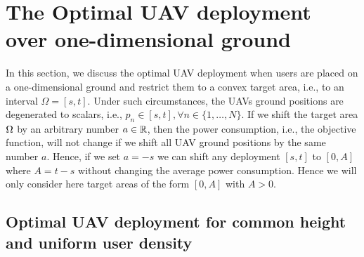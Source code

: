 \documentclass[smallabstract,smallcaptions]{dccpaper}
\newcommand{\philippstart}{\color{black}}
\newcommand{\philippend}{\color{black}}
\begin{document}
\section{The Optimal UAV deployment over one-dimensional ground}

In this section, we discuss the optimal UAV deployment when users are placed on a one-dimensional ground and restrict
them to a convex target area, i.e., to an interval $\Omega = [s,t]$.  Under such circumstances, the UAVs ground positions
are degenerated to scalars, i.e., $p_n\in[s, t], \forall n\in\{1, \dots, N\}$.  \philippstart If we shift the target
area $\Omega$ by an arbitrary number $a\in{\ensuremath{\mathbb R}}$, then the power consumption, i.e., the objective function, will not change
if we shift all UAV ground positions by the same number $a$. Hence, if we set $a=-s$ we can shift any deployment $[s,t]$
to $[0,A]$ where $A=t-s$ without changing the average power consumption. Hence we will only consider here target areas
of the form $[0,A]$ with $A>0$.  \philippend

\subsection{Optimal UAV deployment for common height and uniform user density}
\end{document}
